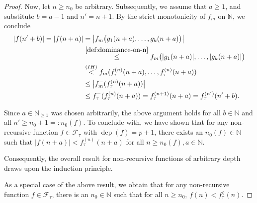\begin{proof}
	Now, let $n\geq n_0$ be arbitrary. 
	Subsequently, we assume that $a\geq 1$, and substitute $b=a-1$ and $n'=n+1$.
	By the strict monotonicity of $f_m$ on $\mathbb{N}$, we conclude
	\begin{align}
		\label{eq:theorem:recursive-completion-not-non-recursive-expressible-integer-induction-step}
		|f(n'+b)|=|f(n+a)|
		&=\bigl|f_m\bigl(g_1(n+a),\dots,g_k(n+a)\bigr)\bigr|\\
		&\overset{\ref{def:dominance-on-n}}{\leq} f_m\bigl(|g_1(n+a)|,\dots,|g_k(n+a)|\bigr)\\
		&\overset{(IH)}{<}f_m(f_\tau^{(n)}(n+a),\dots,f_\tau^{(n)}(n+a))\\
		&\leq\bigl|f_m^{-}(f_\tau^{(n)}(n+a))\bigr|\\
		&\leq f_\tau^{-}(f_\tau^{(n)}(n+a))=f_{\tau}^{(n+1)}(n+a)=f_{\tau}^{(n')}(n'+b).
	\end{align}
	
	Since $a\in\mathbb{N}_{\geq 1}$ was chosen arbitrarily, the above argument holds for all $b\in\mathbb{N}$ and all $n'\geq n_0+1=:n_0(f)$. 
	To conclude with, we have shown that for any non-recursive function $f\in \mathcal{F}_{\tau}$ with $\operatorname{dep}(f)=p+1$, there exists an $n_0(f)\in\mathbb{N}$ such that $|f(n+a)|<f_\tau^{(n)}(n+a)$ for all $n\geq n_0(f),a\in\mathbb{N}$.
	
	Consequently, the overall result for non-recursive functions of arbitrary depth draws upon the induction principle.
	
	As a special case of the above result, we obtain that for any non-recursive function $f\in \mathcal{F}_{\tau}$, there is an $n_0\in\mathbb{N}$ such that for all $n\geq n_0$, $f(n)<f_{\tau}^{\lozenge}(n)$.
	
\end{proof}